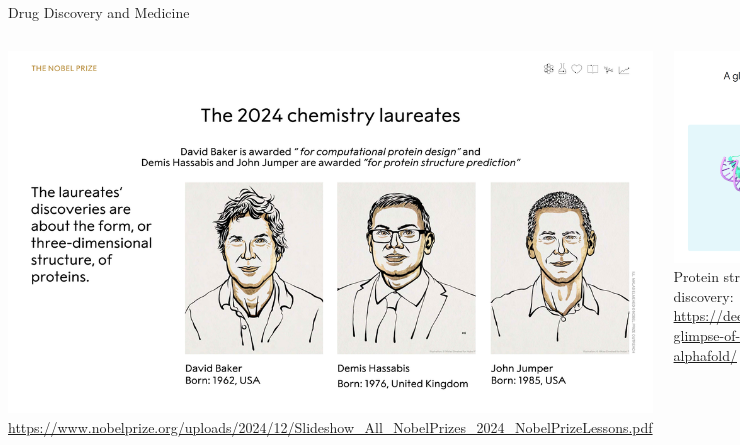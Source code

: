 \documentclass[aspectratio=169,xcolor=dvipsnames,svgnames,x11names,fleqn]{beamer}
\begin{document}
\begin{frame}{Drug Discovery and Medicine}

 \begin{columns}[c] 
  \begin{center}
    \includegraphics[width=.95\textwidth]{figures/nobel_physics_2024_alpha_fold_2.pdf}\\
     {\tiny\color{MediumRed}\url{https://www.nobelprize.org/uploads/2024/12/Slideshow_All_NobelPrizes_2024_NobelPrizeLessons.pdf}}
  \end{center}

  \begin{center}
    \includegraphics[width=.95\textwidth]{figures/alpha_fold.png}\\
     {\tiny Protein structure understanding and discovery: {\color{MediumRed}\url{https://deepmind.google/discover/blog/a-glimpse-of-the-next-generation-of-alphafold/}}}
  \end{center}
   \end{columns}
\end{frame}
\end{document}
